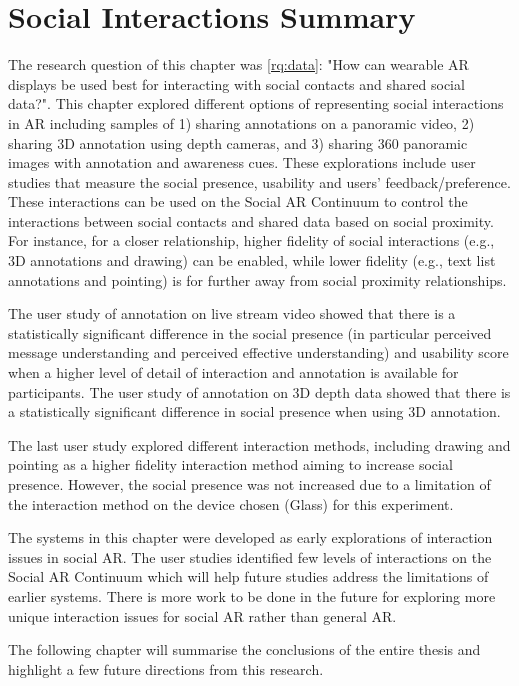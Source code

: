\pagebreak
\section{Social Interactions Summary}

The research question of this chapter was \ref{rq:data}: "How can wearable AR displays be used best for interacting with social contacts and shared social data?". This chapter explored different options of representing social interactions in AR including samples of 1) sharing annotations on a panoramic video, 2) sharing 3D annotation using depth cameras, and 3) sharing 360 panoramic images with annotation and awareness cues. These explorations include user studies that measure the social presence, usability and users' feedback/preference. These interactions can be used on the Social AR Continuum to control the interactions between social contacts and shared data based on social proximity. For instance, for a closer relationship, higher fidelity of social interactions (e.g., 3D annotations and drawing) can be enabled, while lower fidelity (e.g., text list annotations and pointing) is for further away from social proximity relationships.

The user study of annotation on live stream video showed that there is a statistically significant difference in the social presence (in particular perceived message understanding and perceived effective understanding) and usability score when a higher level of detail of interaction and annotation is available for participants. The user study of annotation on 3D depth data showed that there is a statistically significant difference in social presence when using 3D annotation. 

The last user study explored different interaction methods, including drawing and pointing as a higher fidelity interaction method aiming to increase social presence. However, the social presence was not increased due to a limitation of the interaction method on the device chosen (Glass) for this experiment.

The systems in this chapter were developed as early explorations of interaction issues in social AR. The user studies identified few levels of interactions on the Social AR Continuum which will help future studies address the limitations of earlier systems. There is more work to be done in the future for exploring more unique interaction issues for social AR rather than general AR. 

The following chapter will summarise the conclusions of the entire thesis and highlight a few future directions from this research.
